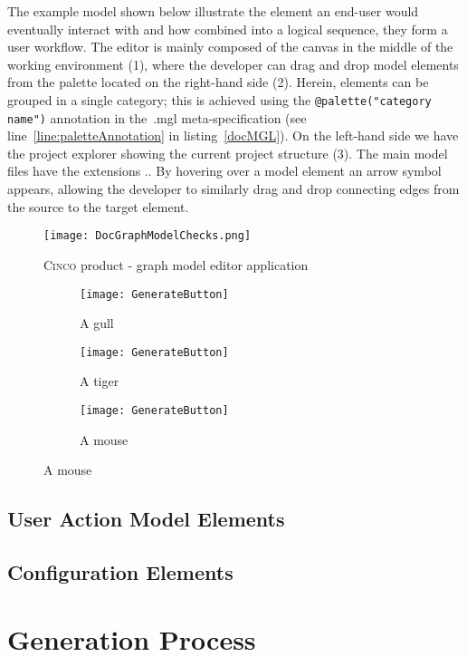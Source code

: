 The example model shown below illustrate the element an end-user would eventually interact with and how combined into a logical sequence, they form a user workflow. The editor is mainly composed of the canvas in the middle of the working environment (1), where the developer can drag and drop model elements from the palette located on the right-hand side (2). Herein, elements can be grouped in a single category; this is achieved using the \lstinline[language=MGL]{@palette("category name")} annotation in the~.mgl meta-specification (see line~\ref{line:paletteAnnotation} in listing~\ref{docMGL}). On the left-hand side we have the project explorer showing the current project structure (3). The main model files have the extensions .. By hovering over a model element an arrow symbol appears, allowing the developer to similarly drag and drop connecting edges from the source to the target element.

\begin{figure}[H]
    \centering
    \texttt{[image: DocGraphModelChecks.png]}
    \caption{\textsc{Cinco} product - graph model editor application}\label{fig:graphDSL}
\end{figure}
\begin{figure}[H]
    \centering
    \begin{subfigure}[b]{0.3\textwidth}
        \centering
        \texttt{[image: GenerateButton]}
        \caption{A gull}
        \label{fig:gull}
    \end{subfigure}
    \begin{subfigure}[b]{0.3\textwidth}
        \centering
        \texttt{[image: GenerateButton]}
        \caption{A tiger}
        \label{fig:tiger}
    \end{subfigure}
    \begin{subfigure}[b]{0.3\textwidth}
        \centering
        \texttt{[image: GenerateButton]}
        \caption{A mouse}
        \label{fig:mouse}
    \end{subfigure}
\end{figure}


\subsection{User Action Model Elements}\label{sec:FuncElem}


\subsection{Configuration Elements}\label{sec:ConfElem}


\section{Generation Process}\label{sec:GenProcess}


